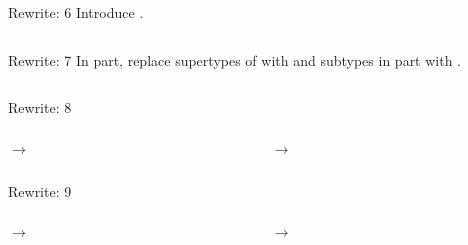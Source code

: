 \begin{frame}{Rewrite: 6}
  Introduce .

  \begin{columns}
    \begin{column}{0.5\textwidth}
      \usebox\typecaseFbox
    \end{column}
    \begin{column}{0.5\textwidth}  %
      \usebox\typecaseGbox
    \end{column}    
  \end{columns}
\end{frame}

\begin{frame}{Rewrite: 7}
  In  part, replace supertypes of  with  and subtypes in  part with .

  \begin{columns}
    \begin{column}{0.5\textwidth}
      \usebox\typecaseGbox
    \end{column}
    \begin{column}{0.5\textwidth}  %
      \usebox\typecaseHhbox
    \end{column}    
  \end{columns}
\end{frame}


\begin{frame}{Rewrite: 8}

  \begin{columns}
    \begin{column}{0.5\textwidth}
       $\to$ 
      \usebox\typecaseHbox
    \end{column}
    \begin{column}{0.5\textwidth}  %
       $\to$ 
      \usebox\typecaseIhbox
    \end{column}    
  \end{columns}
\end{frame}

\begin{frame}{Rewrite: 9}

  \begin{columns}
    \begin{column}{0.5\textwidth}
       $\to$ 
      \usebox\typecaseIbox
    \end{column}
    \begin{column}{0.5\textwidth}  %
       $\to$ 
      \usebox\typecaseJhbox
    \end{column}    
  \end{columns}
\end{frame}

